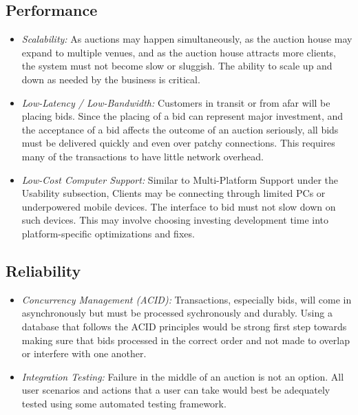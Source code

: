 \documentclass[titlepage, 12pt]{extarticle}
\begin{document}
\subsection{Performance}
\begin{itemize}
\item {\it Scalability:} As auctions may happen simultaneously, as the auction house may expand to multiple venues, and as the auction house attracts more clients, the system must not become slow or sluggish. The ability to scale up and down as needed by the business is critical.
\item {\it Low-Latency / Low-Bandwidth:} Customers in transit or from afar will be placing bids. Since the placing of a bid can represent major investment, and the acceptance of a bid affects the outcome of an auction seriously, all bids must be delivered quickly and even over patchy connections. This requires many of the transactions to have little network overhead.
\item {\it Low-Cost Computer Support:} Similar to Multi-Platform Support under the Usability subsection, Clients may be connecting through limited PCs or underpowered mobile devices. The interface to bid must not slow down on such devices. This may involve choosing investing development time into platform-specific optimizations and fixes.
\end{itemize}
\subsection{Reliability}
\begin{itemize}
\item {\it Concurrency Management (ACID):} Transactions, especially bids, will come in asynchronously but must be processed sychronously and durably. Using a database that follows the ACID principles would be strong first step towards making sure that bids processed in the correct order and not made to overlap or interfere with one another.
\item {\it Integration Testing:} Failure in the middle of an auction is not an option. All user scenarios and actions that a user can take would best be adequately tested using some automated testing framework.
\end{itemize}
\end{document}
